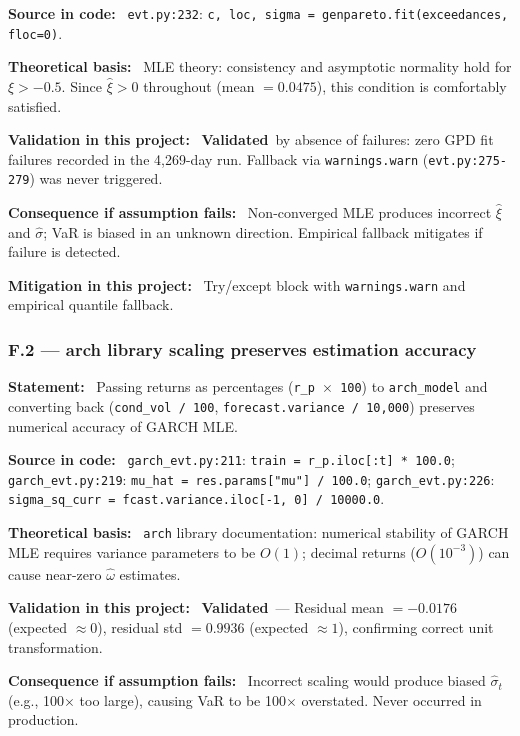 \documentclass[11pt,a4paper]{article}
\newcommand{\asmfield}[1]{\medskip\noindent\textbf{#1:}\ }
\newcommand{\code}[1]{\texttt{#1}}
\newcommand{\validated}{\textbf{Validated}}
\begin{document}
\asmfield{Source in code}
\code{evt.py:232}: \lstinline|c, loc, sigma = genpareto.fit(exceedances, floc=0)|.

\asmfield{Theoretical basis}
MLE theory: consistency and asymptotic normality hold for $\xi > -0.5$.
Since $\hat{\xi} > 0$ throughout (mean $= 0.0475$), this condition is
comfortably satisfied.

\asmfield{Validation in this project}
\validated\ by absence of failures: zero GPD fit failures recorded in the
4{,}269-day run. Fallback via \code{warnings.warn} (\code{evt.py:275-279})
was never triggered.

\asmfield{Consequence if assumption fails}
Non-converged MLE produces incorrect $\hat{\xi}$ and $\hat{\sigma}$; VaR
is biased in an unknown direction. Empirical fallback mitigates if failure
is detected.

\asmfield{Mitigation in this project}
Try/except block with \code{warnings.warn} and empirical quantile fallback.

\subsubsection{F.2 --- arch library scaling preserves estimation accuracy}\label{asm:F2}

\asmfield{Statement}
Passing returns as percentages (\code{r\_p $\times$ 100}) to \code{arch\_model}
and converting back (\code{cond\_vol / 100}, \code{forecast.variance / 10{,}000})
preserves numerical accuracy of GARCH MLE.

\asmfield{Source in code}
\code{garch\_evt.py:211}: \lstinline|train = r_p.iloc[:t] * 100.0|;
\code{garch\_evt.py:219}: \lstinline|mu_hat = res.params["mu"] / 100.0|;
\code{garch\_evt.py:226}: \lstinline|sigma_sq_curr = fcast.variance.iloc[-1, 0] / 10000.0|.

\asmfield{Theoretical basis}
\code{arch} library documentation: numerical stability of GARCH MLE
requires variance parameters to be $O(1)$; decimal returns ($O(10^{-3})$)
can cause near-zero $\hat{\omega}$ estimates.

\asmfield{Validation in this project}
\validated\ --- Residual mean $= -0.0176$ (expected $\approx 0$), residual
std $= 0.9936$ (expected $\approx 1$), confirming correct unit transformation.

\asmfield{Consequence if assumption fails}
Incorrect scaling would produce biased $\hat{\sigma}_t$ (e.g., 100$\times$
too large), causing VaR to be 100$\times$ overstated. Never occurred in
production.
\end{document}
